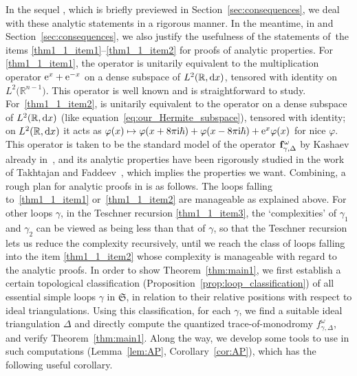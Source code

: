 \documentclass[pdftex]{sigma}
\numberwithin{equation}{section}
\theoremstyle{definition}
\begin{document}
In the sequel \cite{sequel}, which is briefly previewed in Section~\ref{sec:consequences}, we deal with these analytic statements in a rigorous manner.
In the meantime, in \cite{sequel} and Section~\ref{sec:consequences}, we also justify the usefulness of the statements of~the items \ref{thm1_1_item1}--\ref{thm1_1_item2} for proofs of analytic properties. For \ref{thm1_1_item1}, the operator  is unitarily equivalent to the multiplication operator ${\rm e}^x + {\rm e}^{-x}$ on a dense subspace of $L^2(\mathbb{R},{\rm d}x)$, tensored with identity on $L^2\bigl(\mathbb{R}^{n-1}\bigr)$. This operator is well known and is straightforward to study. For~\ref{thm1_1_item2},  is unitarily equivalent to the operator  on a dense subspace of $L^2(\mathbb{R},{\rm d}x)$ (like equation~\eqref{eq:our_Hermite_subspace}), tensored with identity; on $L^2(\mathbb{R},{\rm d}x)$ it acts as $\varphi(x) \mapsto \varphi(x+8\pi {\rm i} \hbar) + \varphi(x-8\pi {\rm i} \hbar) + {\rm e}^x \varphi(x)$ for nice $\varphi$. This operator is taken to be the standard model of the operator ${\bf f}^\omega_{\gamma,\Delta}$ by Kashaev already in~\cite{Kash00}, and its analytic properties have been rigorously studied in the work of Takhtajan and Faddeev~\cite{FT}, which implies the properties we want.
Combining, a rough plan for analytic proofs in \cite{sequel} is as follows. The loops falling to~\ref{thm1_1_item1} or~\ref{thm1_1_item2} are manageable as explained above. For other loops $\gamma$, in the Teschner recursion \ref{thm1_1_item3}, the `complexities' of $\gamma_1$ and $\gamma_2$ can be viewed as being less than that of $\gamma$, so that the Teschner recursion lets us reduce the complexity recursively, until we reach the class of loops falling into the item \ref{thm1_1_item2} whose complexity is manageable with regard to the analytic proofs.
In order to show Theorem~\ref{thm:main1}, we first establish a certain topological classification (Proposition~\ref{prop:loop_classification}) of all essential simple loops $\gamma$ in $\mathfrak{S}$, in relation to their relative positions with respect to ideal triangulations. Using this classification, for each $\gamma$, we find a suitable ideal triangulation $\Delta$ and directly compute the quantized trace-of-monodromy $f^\omega_{\gamma,\Delta}$, and verify Theorem~\ref{thm:main1}. Along the way, we develop some tools to use in such computations (Lemma~\ref{lem:AP}, Corollary~\ref{cor:AP}), which has the following useful corollary.
\end{document}
